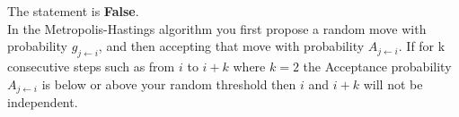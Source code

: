 The statement is \textbf{False}. \\

In the Metropolis-Hastings algorithm you first propose a random move with probability $g_{j\xleftarrow{}i}$, and then accepting that move with probability $A_{j\xleftarrow{}i}$. If for k consecutive steps such as from $i$ to $i+k$ where $k=2$ the Acceptance probability $A_{j\xleftarrow{}i}$ is below or above your random threshold then $i$ and $i+k$ will not be independent.